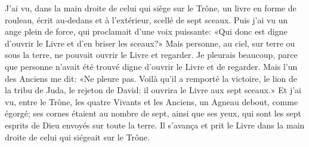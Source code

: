 J’ai vu, dans la main droite de celui qui siège sur le Trône,
	un livre en forme de rouleau, écrit au-dedans et à l’extérieur,
	scellé de sept sceaux.
Puis j’ai vu un ange plein de force, qui proclamait d’une voix puissante:
	«Qui donc est digne d’ouvrir le Livre et d’en briser les sceaux?»
Mais personne, au ciel, sur terre ou sous la terre,
	ne pouvait ouvrir le Livre et regarder.
Je pleurais beaucoup,
	parce que personne n’avait été trouvé digne d’ouvrir le Livre et de regarder.
Mais l’un des Anciens me dit: «Ne pleure pas.
Voilà qu’il a remporté la victoire,
	le lion de la tribu de Juda, le rejeton de David:
	il ouvrira le Livre aux sept sceaux.»
Et j’ai vu, entre le Trône, les quatre Vivants et les Anciens,
	un Agneau debout, comme égorgé;
	ses cornes étaient au nombre de sept, ainsi que ses yeux,
	qui sont les sept esprits de Dieu envoyés sur toute la terre.
Il s’avança et prit le Livre dans la main droite de celui qui siégeait sur le Trône.
